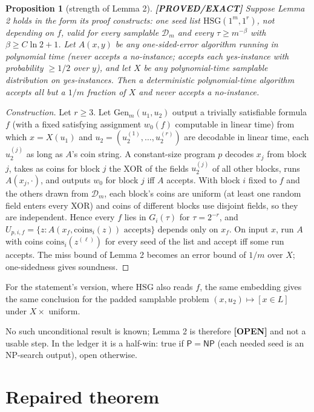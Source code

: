 \documentclass[11pt]{article}
\newtheorem{proposition}[theorem]{Proposition}
\theoremstyle{remark}
\newcommand{\cP}{\mathsf{P}}
\newcommand{\NP}{\mathsf{NP}}
\newcommand{\D}{\mathcal{D}}
\newcommand{\status}[1]{\textbf{[#1]}}
\begin{document}
\begin{proposition}[strength of Lemma 2]\label{prop:embed} \status{PROVED/EXACT}
Suppose Lemma 2 holds in the form its proof constructs: one seed list $\mathrm{HSG}(1^m,1^r)$, not
depending on $f$, valid for every samplable $\D_m$ and every $\tau\ge m^{-\beta}$ with
$\beta\ge C\ln 2+1$. Let $A(x,y)$ be any one-sided-error algorithm running in polynomial time (never
accepts a no-instance; accepts each yes-instance with probability $\ge 1/2$ over $y$), and let $X$ be any
polynomial-time samplable distribution on yes-instances. Then a deterministic polynomial-time algorithm
accepts all but a $1/m$ fraction of $X$ and never accepts a no-instance.
\end{proposition}
\begin{proof}[Construction]
Let $r\ge 3$. Let $\mathrm{Gen}_m(u_1,u_2)$ output a trivially satisfiable formula $f$ (with a fixed
satisfying assignment $w_0(f)$ computable in linear time) from which $x=X(u_1)$ and
$u_2=(u_2^{(1)},\dots,u_2^{(r)})$ are decodable in linear time, each $u_2^{(j)}$ as long as $A$'s coin
string. A constant-size program $p$ decodes $x_j$ from block $j$, takes as coins for block $j$ the XOR
of the fields $u_2^{(j)}$ of all other blocks, runs $A(x_j,\cdot)$, and outputs $w_0$ for block $j$ iff
$A$ accepts. With block $i$ fixed to $f$ and the others drawn from $\D_m$, each block's coins are uniform
(at least one random field enters every XOR) and coins of different blocks use disjoint fields, so they
are independent. Hence every $f$ lies in $G_i(\tau)$ for $\tau=2^{-r}$, and
$U_{p,i,f}=\{z:A(x_f,\mathrm{coins}_i(z))\text{ accepts}\}$ depends only on $x_f$. On input $x$, run $A$
with coins $\mathrm{coins}_i(z^{(\ell)})$ for every seed of the list and accept iff some run accepts.
The miss bound of Lemma 2 becomes an error bound of $1/m$ over $X$; one-sidedness gives soundness.
\end{proof}

\noindent For the statement's version, where $\mathrm{HSG}$ also reads $f$, the same embedding gives the
same conclusion for the padded samplable problem $(x,u_2)\mapsto[x\in L]$ under $X\times$ uniform.

\noindent No such unconditional result is known; Lemma 2 is therefore \status{OPEN} and not a usable
step. In the ledger it is a half-win: true if $\cP=\NP$ (each needed seed is an NP-search output),
open otherwise.

\section{Repaired theorem}
\end{document}

